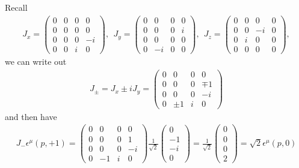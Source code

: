 \documentclass[11pt]{article}
\def\eps{\epsilon}
\begin{document}
\section{ }
Recall
\begin{eqnarray}
    J_x = 
    \begin{pmatrix}
      0 & 0 & 0 & 0\\
      0 & 0 & 0 & 0 \\
      0 & 0 & 0 & -i \\
      0 & 0 & i & 0
    \end{pmatrix}
    ,~~ J_y =
    \begin{pmatrix}
      0 & 0 & 0 & 0 \\
      0 & 0 & 0 & i \\
      0 & 0 & 0 & 0 \\
      0 & -i & 0 & 0 
    \end{pmatrix}
    ,~~J_z=
    \begin{pmatrix}
      0 & 0 & 0 & 0 \\
      0 & 0 & -i & 0 \\
      0 & i & 0 & 0 \\
      0 & 0 & 0 & 0 
    \end{pmatrix},
  \end{eqnarray}
we can write out
\begin{eqnarray}
  J_\pm =J_x\pm iJ_y=
  \begin{pmatrix}
    0 & 0 & 0 & 0\\
    0 & 0 & 0 & \mp 1 \\
    0 & 0 & 0 & -i \\
    0 & \pm 1 & i & 0
  \end{pmatrix}
\end{eqnarray}
and then have
\begin{eqnarray}
    J_- \eps^\mu(p,+1) = 
    \begin{pmatrix}
        0 & 0 & 0 & 0\\
        0 & 0 & 0 & 1 \\
        0 & 0 & 0 & -i \\
        0 & - 1 & i & 0
    \end{pmatrix}
    \frac{1}{\sqrt 2}
    \begin{pmatrix}
        0 \\ -1 \\ -i \\ 0
    \end{pmatrix}
    =\frac{1}{\sqrt 2}
    \begin{pmatrix}
        0 \\ 0 \\ 0 \\ 2
    \end{pmatrix}
    =\sqrt{2} \eps^\mu(p,0) 
\end{eqnarray}
\end{document}

